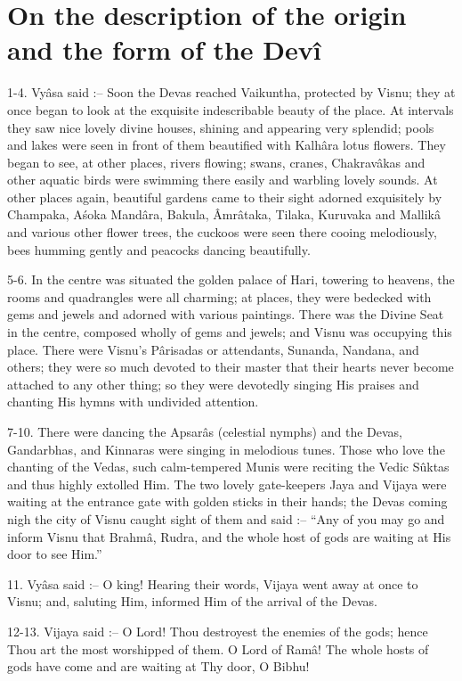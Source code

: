 ﻿\chapter{On the description of the origin and the form of the Dev\^i}

1-4. Vy\^asa said :-- Soon the Devas reached Vaikuntha, protected by Visnu; they at once began to look at the exquisite indescribable beauty of the place. At intervals they saw nice lovely divine houses, shining and appearing very splendid; pools and lakes were seen in front of them beautified with Kalh\^ara lotus flowers. They began to see, at other places, rivers flowing; swans, cranes, Chakrav\^akas and other aquatic birds were swimming there easily and warbling lovely sounds. At other places again, beautiful gardens came to their sight adorned exquisitely by Champaka, A\'soka Mand\^ara, Bakula, \^Amr\^ataka, Tilaka, Kuruvaka and Mallik\^a and various other flower trees, the cuckoos were seen there cooing melodiously, bees humming gently and peacocks dancing beautifully.

5-6. In the centre was situated the golden palace of Hari, towering to heavens, the rooms and quadrangles were all charming; at places, they were bedecked with gems and jewels and adorned with various paintings. There was the Divine Seat in the centre, composed wholly of gems and jewels; and Visnu was occupying this place. There were Visnu's P\^arisadas or attendants, Sunanda, Nandana, and others; they were so much devoted to their master that their hearts never become attached to any other thing; so they were devotedly singing His praises and chanting His hymns with undivided attention.

7-10. There were dancing the Apsar\^as (celestial nymphs) and the Devas, Gandarbhas, and Kinnaras were singing in melodious tunes. Those who love the chanting of the Vedas, such calm-tempered Munis were reciting the Vedic S\^uktas and thus highly extolled Him. The two lovely gate-keepers Jaya and Vijaya were waiting at the entrance gate with golden sticks in their hands; the Devas coming nigh the city of Visnu caught sight of them and said :-- ``Any of you may go and inform Visnu that Brahm\^a, Rudra, and the whole host of gods are waiting at His door to see Him.''

11. Vy\^asa said :-- O king! Hearing their words, Vijaya went away at once to Visnu; and, saluting Him, informed Him of the arrival of the Devas.

12-13. Vijaya said :-- O Lord! Thou destroyest the enemies of the gods; hence Thou art the most worshipped of them. O Lord of Ram\^a! The whole hosts of gods have come and are waiting at Thy door, O Bibhu!

